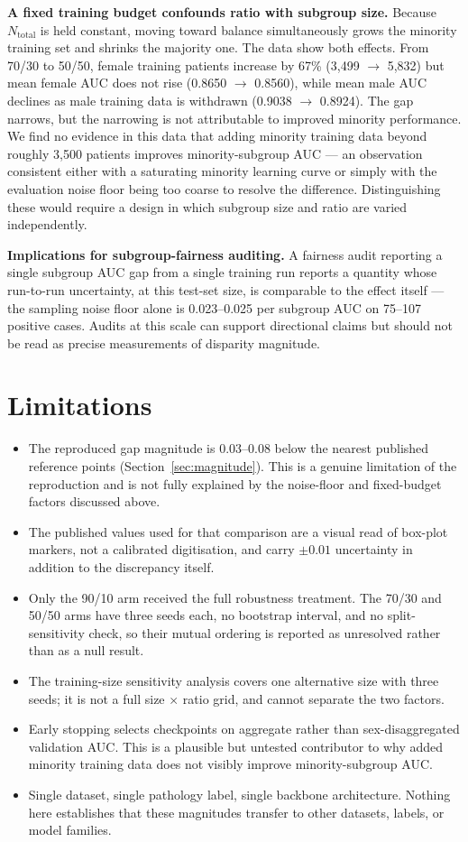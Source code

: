 \documentclass[11pt]{article}
\begin{document}
\textbf{A fixed training budget confounds ratio with subgroup size.} Because $N_{\text{total}}$ is held constant, moving toward balance simultaneously grows the minority training set and shrinks the majority one. The data show both effects. From 70/30 to 50/50, female training patients increase by 67\% (3,499 $\rightarrow$ 5,832) but mean female AUC does not rise (0.8650 $\rightarrow$ 0.8560), while mean male AUC declines as male training data is withdrawn (0.9038 $\rightarrow$ 0.8924). The gap narrows, but the narrowing is not attributable to improved minority performance. We find no evidence in this data that adding minority training data beyond roughly 3,500 patients improves minority-subgroup AUC --- an observation consistent either with a saturating minority learning curve or simply with the evaluation noise floor being too coarse to resolve the difference. Distinguishing these would require a design in which subgroup size and ratio are varied independently.

\textbf{Implications for subgroup-fairness auditing.} A fairness audit reporting a single subgroup AUC gap from a single training run reports a quantity whose run-to-run uncertainty, at this test-set size, is comparable to the effect itself --- the sampling noise floor alone is 0.023--0.025 per subgroup AUC on 75--107 positive cases. Audits at this scale can support directional claims but should not be read as precise measurements of disparity magnitude.

\section{Limitations}
\begin{itemize}\itemsep0.2em
\item The reproduced gap magnitude is 0.03--0.08 below the nearest published reference points (Section~\ref{sec:magnitude}). This is a genuine limitation of the reproduction and is not fully explained by the noise-floor and fixed-budget factors discussed above.
\item The published values used for that comparison are a visual read of box-plot markers, not a calibrated digitisation, and carry $\pm0.01$ uncertainty in addition to the discrepancy itself.
\item Only the 90/10 arm received the full robustness treatment. The 70/30 and 50/50 arms have three seeds each, no bootstrap interval, and no split-sensitivity check, so their mutual ordering is reported as unresolved rather than as a null result.
\item The training-size sensitivity analysis covers one alternative size with three seeds; it is not a full size $\times$ ratio grid, and cannot separate the two factors.
\item Early stopping selects checkpoints on aggregate rather than sex-disaggregated validation AUC. This is a plausible but untested contributor to why added minority training data does not visibly improve minority-subgroup AUC.
\item Single dataset, single pathology label, single backbone architecture. Nothing here establishes that these magnitudes transfer to other datasets, labels, or model families.
\end{itemize}
\end{document}
